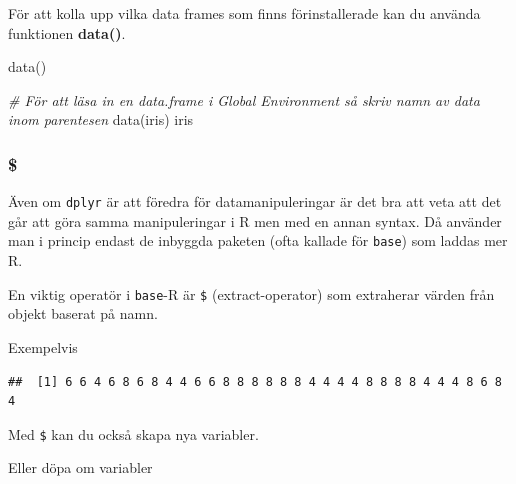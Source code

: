 \documentclass[
]{book}
\newenvironment{Shaded}{\begin{snugshade}}{\end{snugshade}}
\newcommand{\CommentTok}[1]{\textcolor[rgb]{0.56,0.35,0.01}{\textit{#1}}}
\newcommand{\FunctionTok}[1]{\textcolor[rgb]{0.00,0.00,0.00}{#1}}
\newcommand{\NormalTok}[1]{#1}
\newcommand{\OtherTok}[1]{\textcolor[rgb]{0.56,0.35,0.01}{#1}}
\newcommand{\SpecialCharTok}[1]{\textcolor[rgb]{0.00,0.00,0.00}{#1}}
\begin{document}
För att kolla upp vilka data frames som finns förinstallerade kan du använda funktionen \textbf{data()}.

\begin{Shaded}
\begin{Highlighting}[]
\FunctionTok{data}\NormalTok{()}

\CommentTok{\# För att läsa in en data.frame i Global Environment så skriv namn av data inom parentesen}
\FunctionTok{data}\NormalTok{(iris)}
\NormalTok{iris}
\end{Highlighting}
\end{Shaded}

\hypertarget{section}{%
\subsubsection{\$}\label{section}}

Även om \texttt{dplyr} är att föredra för datamanipuleringar är det bra att veta att det går att göra samma manipuleringar i R men med en annan syntax. Då använder man i princip endast de inbyggda paketen (ofta kallade för \texttt{base}) som laddas mer R.

En viktig operatör i \texttt{base}-R är \texttt{\$} (extract-operator) som extraherar värden från objekt baserat på namn.

Exempelvis

\begin{Shaded}
\end{Shaded}

\begin{verbatim}
##  [1] 6 6 4 6 8 6 8 4 4 6 6 8 8 8 8 8 8 4 4 4 4 8 8 8 8 4 4 4 8 6 8 4
\end{verbatim}

Med \texttt{\$} kan du också skapa nya variabler.

\begin{Shaded}
\end{Shaded}

Eller döpa om variabler
\end{document}
